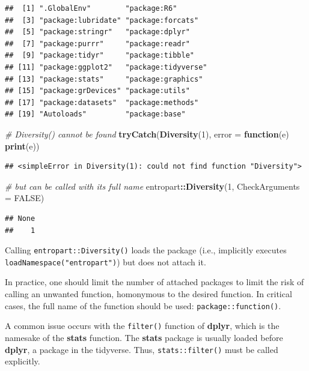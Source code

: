 \documentclass[
  12pt,
  american,
  a4paper,
  extrafontsizes,onecolumn,openright
  ]{memoir}
\newenvironment{Shaded}{\begin{snugshade}}{\end{snugshade}}
\newcommand{\AttributeTok}[1]{\textcolor[rgb]{0.13,0.29,0.53}{#1}}
\newcommand{\CommentTok}[1]{\textcolor[rgb]{0.56,0.35,0.01}{\textit{#1}}}
\newcommand{\ConstantTok}[1]{\textcolor[rgb]{0.56,0.35,0.01}{#1}}
\newcommand{\ControlFlowTok}[1]{\textcolor[rgb]{0.13,0.29,0.53}{\textbf{#1}}}
\newcommand{\DecValTok}[1]{\textcolor[rgb]{0.00,0.00,0.81}{#1}}
\newcommand{\FunctionTok}[1]{\textcolor[rgb]{0.13,0.29,0.53}{\textbf{#1}}}
\newcommand{\NormalTok}[1]{#1}
\newcommand{\SpecialCharTok}[1]{\textcolor[rgb]{0.81,0.36,0.00}{\textbf{#1}}}
\begin{document}
\begin{verbatim}
##  [1] ".GlobalEnv"        "package:R6"       
##  [3] "package:lubridate" "package:forcats"  
##  [5] "package:stringr"   "package:dplyr"    
##  [7] "package:purrr"     "package:readr"    
##  [9] "package:tidyr"     "package:tibble"   
## [11] "package:ggplot2"   "package:tidyverse"
## [13] "package:stats"     "package:graphics" 
## [15] "package:grDevices" "package:utils"    
## [17] "package:datasets"  "package:methods"  
## [19] "Autoloads"         "package:base"
\end{verbatim}

\begin{Shaded}
\begin{Highlighting}[]
\CommentTok{\# Diversity() cannot be found}
\FunctionTok{tryCatch}\NormalTok{(}\FunctionTok{Diversity}\NormalTok{(}\DecValTok{1}\NormalTok{), }\AttributeTok{error =} \ControlFlowTok{function}\NormalTok{(e) }\FunctionTok{print}\NormalTok{(e))}
\end{Highlighting}
\end{Shaded}

\begin{verbatim}
## <simpleError in Diversity(1): could not find function "Diversity">
\end{verbatim}

\begin{Shaded}
\begin{Highlighting}[]
\CommentTok{\# but can be called with its full name}
\NormalTok{entropart}\SpecialCharTok{::}\FunctionTok{Diversity}\NormalTok{(}\DecValTok{1}\NormalTok{, }\AttributeTok{CheckArguments =} \ConstantTok{FALSE}\NormalTok{)}
\end{Highlighting}
\end{Shaded}

\begin{verbatim}
## None 
##    1
\end{verbatim}

\normalsize

Calling \texttt{entropart::Diversity()} loads the package (i.e., implicitly executes \texttt{loadNamespace("entropart")}) but does not attach it.

In practice, one should limit the number of attached packages to limit the risk of calling an unwanted function, homonymous to the desired function.
In critical cases, the full name of the function should be used: \texttt{package::function()}.

A common issue occurs with the \texttt{filter()} function of \textbf{dplyr}, which is the namesake of the \textbf{stats} function.
The \textbf{stats} package is usually loaded before \textbf{dplyr}, a package in the tidyverse.
Thus, \texttt{stats::filter()} must be called explicitly.
\end{document}
